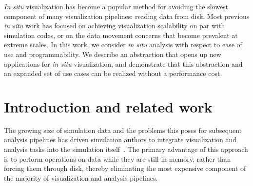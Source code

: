 \newcommand{\freeprocessing}[0]{\textit{Free}processing}
\newcommand{\freeprocessor}[0]{\textit{free}processor}
\newcommand{\nullset}[0]{$\varnothing$}
\newcommand{\insitu}[0]{\textit{in situ}}


\textit{In situ} visualization has become a popular method for avoiding
the slowest component of many visualization pipelines: reading data
from disk.  Most previous \insitu{} work has focused on achieving
visualization scalability on par with simulation codes, or on the data
movement concerns that become prevalent at extreme scales.
In this work, we consider \insitu{} analysis with respect to ease of
use and programmability.  We describe an abstraction that
opens up new applications for \insitu{} visualization, and demonstrate
that this abstraction and an expanded set of use cases can be realized
without a performance cost.

\section{Introduction and related work}


The growing size of simulation data and the problems this poses
for subsequent analysis pipelines has driven simulation authors to
integrate visualization and analysis tasks into the simulation
itself~\cite{Childs:2013:ChallengesVis}.  The primary advantage of
this approach is to perform operations on data while they are still in
memory, rather than forcing them through disk, thereby eliminating the
most expensive component of the majority of visualization and analysis
pipelines.

